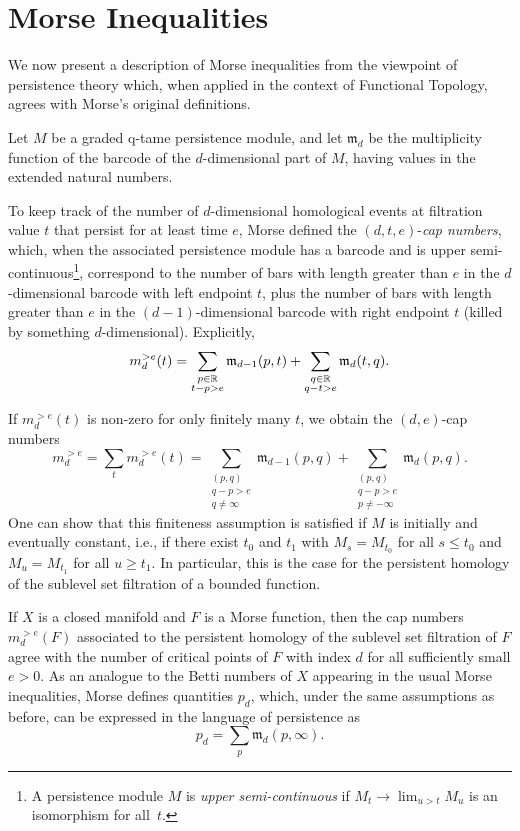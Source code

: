 
\section{Morse Inequalities} \label{s:inequalities}

We now present a description of Morse inequalities from the viewpoint of persistence theory which, when applied in the context of Functional Topology, agrees with Morse's original definitions.

Let $M$ be a graded q-tame persistence module, and let $\mathfrak{m}_d$ be the multiplicity function of the barcode of the $d$-dimensional part of $M$, having values in the extended natural numbers.

To keep track of the number of $d$-dimensional homological events at filtration value $t$ that persist for at least time $e$, Morse defined the $(d, t, e)$-\textit{cap numbers}, which, when the associated persistence module has a barcode and is upper semi-continuous\footnote{A persistence module $M$ is \emph{upper semi-continuous} if $M_{t} \to \lim_{u > t} M_{u}$ is an isomorphism for all~$t$.}, correspond to the number of bars with length greater than $e$ in the $d$-dimensional barcode with left endpoint $t$, plus the number of bars with length greater than $e$ in the $(d-1)$-dimensional barcode with right endpoint $t$ (killed by something $d$-dimensional).
Explicitly,
\[
    m_{d}^{> e}(t) =
    \sum_{\substack{p \in \mathbb{R} \\ t-p>e}} \mathfrak{m}_{d-1}(p, t) +
    \sum_{\substack{q \in \mathbb{R} \\ q-t>e}} \mathfrak{m}_d(t, q).
\]

If $m_{d}^{> e}(t)$ is non-zero for only finitely many $t$, we obtain the $(d,e)$-cap numbers 
\[
m_{d}^{> e } = \sum_{t} m_{d}^{> e}(t) = \sum_{\substack{(p,q)\\q-p>e\\q\neq\infty}}\mathfrak{m}_{d-1}(p,q)+\sum_{\substack{(p,q)\\q-p>e\\p\neq-\infty}}\mathfrak{m}_d(p,q).
\] 
One can show that this finiteness assumption is satisfied if $M$ is initially and eventually constant, i.e., if there exist $t_0$ and $t_1$ with $M_s = M_{t_0}$ for all $s \leq t_0$ and $M_u = M_{t_1}$ for all $u \geq t_1$. In particular, this is the case for the persistent homology of the sublevel set filtration of a bounded function.

If $X$ is a closed manifold and $F$ is a Morse function, then the cap numbers $m_{d}^{> e}(F)$ associated to the persistent homology of the sublevel set filtration of $F$ agree with the number of critical points of $F$ with index $d$ for all sufficiently small $e > 0$. As an analogue to the Betti numbers of $X$ appearing in the usual Morse inequalities, Morse defines quantities $p_{d}$, which, under the same assumptions as before, can be expressed in the language of persistence as
\[
p_{d} = \sum_{p} \mathfrak{m}_d(p,\infty).
\]

